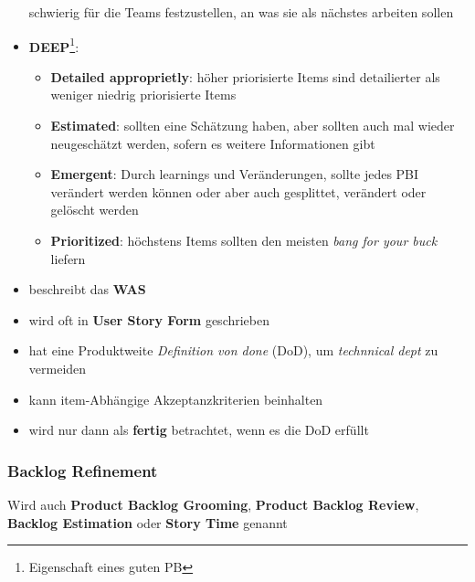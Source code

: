 \begin{itemize}
    schwierig für die Teams festzustellen, an was sie als nächstes arbeiten sollen
  \item \textbf{DEEP}\footnote{Eigenschaft eines guten PB}:
    \begin{itemize}
      \item \textbf{Detailed approprietly}: höher priorisierte Items sind detailierter als weniger niedrig
        priorisierte Items
      \item \textbf{Estimated}: sollten eine Schätzung haben, aber sollten auch mal wieder
        neugeschätzt werden, sofern es weitere Informationen gibt
      \item \textbf{Emergent}: Durch learnings und Veränderungen, sollte jedes PBI verändert
        werden können oder aber auch gesplittet, verändert oder gelöscht werden
      \item \textbf{Prioritized}: höchstens Items sollten den meisten \textit{bang for your buck} liefern
    \end{itemize}
\end{itemize}




\begin{itemize}
  \item beschreibt das \textbf{WAS}
  \item wird oft in \textbf{User Story Form} geschrieben
  \item hat eine Produktweite  \textit{Definition von done} (DoD), um \textit{technnical dept} zu vermeiden
  \item kann item-Abhängige Akzeptanzkriterien beinhalten
  \item wird nur dann als \textbf{fertig} betrachtet, wenn es die DoD erfüllt
\end{itemize}


\subsubsection{Backlog Refinement}
Wird auch \textbf{Product Backlog Grooming}, \textbf{Product Backlog Review}, \textbf{Backlog Estimation} oder \textbf{Story Time} genannt


